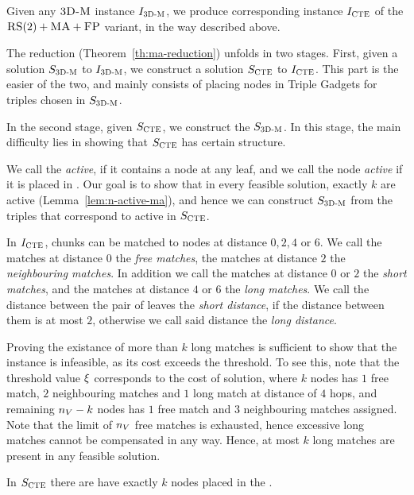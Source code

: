 Given any $\textsc{3D-M}$ instance $I_{\mathrm{\textsc{3D-M}}}$, we produce corresponding instance $I_{\mathrm{\textsc{CTE}}}$ of the $\textsc{RS}(2)+\textsc{MA}+\textsc{FP}$ variant, in the way described above.

The reduction (Theorem~\ref{th:ma-reduction}) unfolds in two stages.
First, given a solution $S_{\mathrm{\textsc{3D-M}}}$ to $I_{\mathrm{\textsc{3D-M}}}$, we construct a solution $S_{\mathrm{\textsc{CTE}}}$ to $I_{\mathrm{\textsc{CTE}}}$.
This part is the easier of the two, and mainly consists of placing nodes in Triple Gadgets for triples chosen in $S_{\mathrm{\textsc{3D-M}}}$.

In the second stage, given $S_{\mathrm{\textsc{CTE}}}$, we construct the $S_{\mathrm{\textsc{3D-M}}}$.
In this stage, the main difficulty lies in showing that $S_{\mathrm{\textsc{CTE}}}$ has certain structure.

We call the {\TripleGadget} \textit{active}, if it contains a node at any leaf, and we call the node \textit{active} if it is placed in {\TripleGadget}.
Our goal is to show that in every feasible solution, exactly $k$ \TripleGadgets{} are active (Lemma~\ref{lem:n-active-ma}), and hence we can construct $S_{\mathrm{\textsc{3D-M}}}$ from the triples that correspond to active \TripleGadgets{} in $S_{\mathrm{\textsc{CTE}}}$.

In $I_{\mathrm{\textsc{CTE}}}$, chunks can be matched to nodes at distance $0, 2, 4$ or $6$.
  We call the matches at distance $0$ the \emph{free matches}, the matches at distance $2$ the \emph{neighbouring matches}.
  In addition we call the matches at distance $0$ or $2$ the \emph{short matches}, and the matches at distance $4$ or $6$ the \emph{long matches}.
  We call the distance between the pair of leaves the \emph{short distance}, if the distance between them is at most $2$, otherwise we call said distance the \emph{long distance}.

Proving the existance of more than $k$ long matches is sufficient to show that the instance is infeasible, as its cost exceeds the threshold.
To see this, note that the threshold value $\xi$ corresponds to the cost of solution, where $k$ nodes has $1$ free match, $2$ neighbouring matches and $1$ long match at distance of $4$ hops, and remaining $n_V-k$ nodes has $1$ free match and $3$ neighbouring matches assigned.
Note that the limit of $n_V$ free matches is exhausted, hence excessive long matches cannot be compensated in any way.
Hence, at most $k$ long matches are present in any feasible solution.


\begin{lemma}
  In $S_{\mathrm{\textsc{CTE}}}$ there are have exactly $k$ nodes placed in the \MatchSubtree.
  \label{lem:n-matchsubtree-ma}
\end{lemma}

